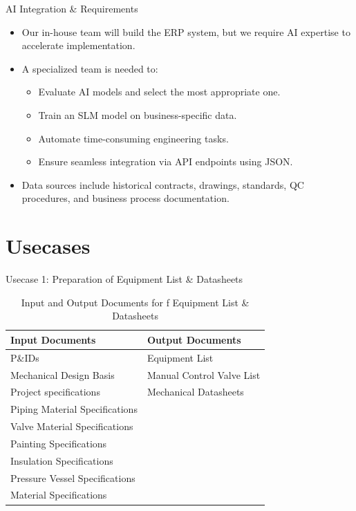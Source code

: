 \documentclass{beamer}
\begin{document}
\begin{frame}{AI Integration \& Requirements}
    \begin{itemize}
        \item Our in-house team will build the ERP system, but we require AI expertise to accelerate implementation.
        \item A specialized team is needed to:
        \begin{itemize}
            \item Evaluate AI models and select the most appropriate one.
            \item Train an SLM model on business-specific data.
            \item Automate time-consuming engineering tasks.
            \item Ensure seamless integration via API endpoints using JSON.
        \end{itemize}
        \item Data sources include historical contracts, drawings, standards, QC procedures, and business process documentation.
    \end{itemize}
\end{frame}
\section{Usecases}
\begin{frame}
    \sectionpage
\end{frame}
\begin{frame}{Usecase 1: Preparation of Equipment List \& Datasheets}
    \begin{table}[h]
        \begin{tabular}{|l|l|}
        \hline
        \textbf{Input Documents} & \textbf{Output Documents} \\ 
        \hline
        P\&IDs & Equipment List \\ 
        Mechanical Design Basis& Manual Control Valve List \\ 
        Project specifications &  Mechanical Datasheets \\ 
        Piping Material Specifications &  \\ 
        Valve Material Specifications &  \\ 
        Painting Specifications &  \\ 
        Insulation Specifications &  \\
        Pressure Vessel Specifications &  \\
        Material Specifications &  \\ 
        \hline
        \end{tabular}
        \caption{Input and Output Documents for f Equipment List \& Datasheets}
    \end{table}
\end{frame}
\end{document}
